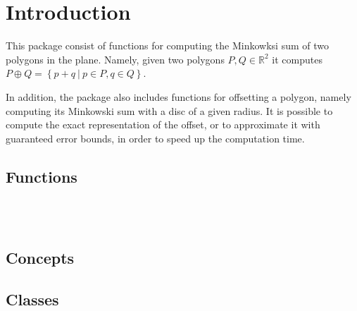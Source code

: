 \clearpage
{}

\section*{Introduction}
\label{mink_ref_sec:intro}

This package consist of functions for computing the Minkowksi sum
of two polygons in the plane. Namely, given two polygons $P,Q \in
\mathbb{R}^2$ it computes $P \oplus Q = \left\{ p + q ~|~ p \in P,
q \in Q \right\}$.

In addition, the package also includes functions for offsetting a
polygon, namely computing its Minkowski sum with a disc of a given
radius. It is possible to compute the exact representation of the
offset, or to approximate it with guaranteed error bounds, in order
to speed up the computation time.

\subsection*{Functions}

\\
\\

\subsection*{Concepts}


\subsection*{Classes}

\\
\\
\\
\\


